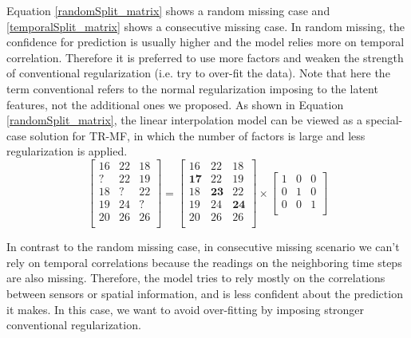Equation \ref{randomSplit_matrix} shows a random missing case and \ref{temporalSplit_matrix} shows a consecutive missing case. In random missing, the confidence for prediction is usually higher and the model relies more on temporal correlation. Therefore it is preferred to use more factors and weaken the strength of conventional regularization (i.e. try to over-fit the data). Note that here the term conventional refers to the normal regularization imposing to the latent features, not the additional ones we proposed. 
As shown in Equation \ref{randomSplit_matrix}, the linear interpolation model can be viewed as a special-case solution for TR-MF, in which the number of factors is large and less regularization is applied. 
\begin{equation}
\label{randomSplit_matrix}
\begin{bmatrix}
16 & 22 & 18\\
 ? & 22 & 19\\
18 &  ?	& 22\\
19 & 24 &  ?\\
20 & 26 & 26\\
\end{bmatrix} 
= 
\begin{bmatrix}
16 & 22 & 18\\
\mathbf{17} & 22 & 19\\
18 & \mathbf{23}	& 22\\
19 & 24 & \mathbf{24}\\
20 & 26 & 26\\
\end{bmatrix} 
\times
\begin{bmatrix}
1 & 0 & 0\\
0 & 1 & 0\\
0 & 0 & 1\\
\end{bmatrix} 
\end{equation}

In contrast to the random missing case, in consecutive missing scenario we can't rely on temporal correlations because the readings on the neighboring time steps are also missing. Therefore, the model tries to rely mostly on the correlations between sensors or spatial information, and is less confident about the prediction it makes. In this case, we want to avoid over-fitting by imposing stronger conventional regularization.

